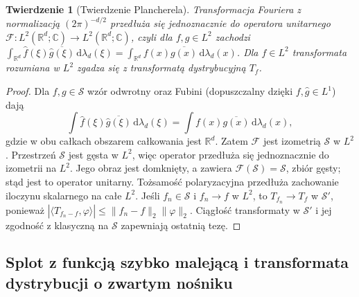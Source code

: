 \documentclass[11pt,a4paper]{article}
\numberwithin{equation}{section}
\theoremstyle{plain}
\newtheorem{twierdzenie}{Twierdzenie}[section]
\theoremstyle{definition}
\theoremstyle{remark}
\newcommand{\R}{\mathbb R}
\newcommand{\C}{\mathbb C}
\begin{document}
\begin{twierdzenie}[Twierdzenie Plancherela]
\label{thm:plancherel22}
Transformacja Fouriera z normalizacją $(2\pi)^{-d/2}$
przedłuża się jednoznacznie do operatora unitarnego
$\mathcal F:L^2(\R^d;\C)\to L^2(\R^d;\C)$,
czyli dla $f,g\in L^2$ zachodzi
$\int_{\R^d}\widehat f(\xi)\overline{\widehat g(\xi)}
\,\mathrm d\lambda_d(\xi)
=\int_{\R^d}f(x)\overline{g(x)}\,\mathrm d\lambda_d(x)$.
Dla $f\in L^2$ transformata rozumiana w $L^2$
zgadza się z transformatą dystrybucyjną $T_f$.
\end{twierdzenie}
\begin{proof}
Dla $f,g\in\mathcal S$ wzór odwrotny oraz Fubini
(dopuszczalny dzięki $f,\widehat g\in L^1$) dają
\[
\int\widehat f(\xi)\overline{\widehat g(\xi)}
\,\mathrm d\lambda_d(\xi)
=\int f(x)\overline{g(x)}\,\mathrm d\lambda_d(x),
\]
gdzie w obu całkach obszarem całkowania jest $\R^d$.
Zatem $\mathcal F$ jest izometrią $\mathcal S$ w $L^2$.
Przestrzeń $\mathcal S$ jest gęsta w $L^2$,
więc operator przedłuża się jednoznacznie do izometrii
na $L^2$. Jego obraz jest domknięty, a zawiera
$\mathcal F(\mathcal S)=\mathcal S$, zbiór gęsty;
stąd jest to operator unitarny. Tożsamość polaryzacyjna
przedłuża zachowanie iloczynu skalarnego na całe $L^2$.
Jeśli $f_n\in\mathcal S$ i $f_n\to f$ w $L^2$,
to $T_{f_n}\to T_f$ w $\mathcal S'$, ponieważ
$|\langle T_{f_n-f},\varphi\rangle|
\le\|f_n-f\|_2\|\varphi\|_2$.
Ciągłość transformaty w $\mathcal S'$ i jej zgodność
z klasyczną na $\mathcal S$ zapewniają ostatnią tezę.
\end{proof}

\subsection{Splot z funkcją szybko malejącą i transformata dystrybucji o zwartym nośniku}
\end{document}
